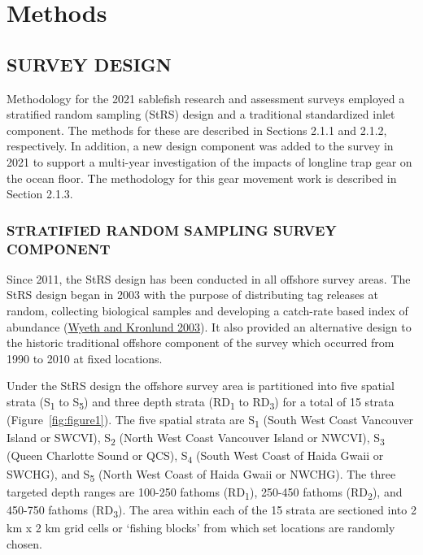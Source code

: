\documentclass[12pt]{article}\usepackage[]{graphicx}\usepackage[]{color}
\begin{document}
\hypertarget{methods}{%
\section{Methods}\label{methods}}

\hypertarget{survey-design}{%
\subsection{SURVEY DESIGN}\label{survey-design}}

Methodology for the 2021 sablefish research and assessment surveys employed a stratified random sampling (StRS) design and a traditional standardized inlet component. The methods for these are described in Sections 2.1.1 and 2.1.2, respectively. In addition, a new design component was added to the survey in 2021 to support a multi-year investigation of the impacts of longline trap gear on the ocean floor. The methodology for this gear movement work is described in Section 2.1.3.

\hypertarget{stratified-random-sampling-survey-component}{%
\subsubsection{STRATIFIED RANDOM SAMPLING SURVEY COMPONENT}\label{stratified-random-sampling-survey-component}}

Since 2011, the StRS design has been conducted in all offshore survey areas. The StRS design began in 2003 with the purpose of distributing tag releases at random, collecting biological samples and developing a catch-rate based index of abundance (\protect\hyperlink{ref-Wyeth2003}{Wyeth and Kronlund 2003}). It also provided an alternative design to the historic traditional offshore component of the survey which occurred from 1990 to 2010 at fixed locations.

Under the StRS design the offshore survey area is partitioned into five spatial strata (S\textsubscript{1} to S\textsubscript{5}) and three depth strata (RD\textsubscript{1} to RD\textsubscript{3}) for a total of 15 strata (Figure~\ref{fig:figure1}). The five spatial strata are S\textsubscript{1} (South West Coast Vancouver Island or SWCVI), S\textsubscript{2} (North West Coast Vancouver Island or NWCVI), S\textsubscript{3} (Queen Charlotte Sound or QCS), S\textsubscript{4} (South West Coast of Haida Gwaii or SWCHG), and S\textsubscript{5} (North West Coast of Haida Gwaii or NWCHG). The three targeted depth ranges are 100-250 fathoms (RD\textsubscript{1}), 250-450 fathoms (RD\textsubscript{2}), and 450-750 fathoms (RD\textsubscript{3}). The area within each of the 15 strata are sectioned into 2 km x 2 km grid cells or `fishing blocks' from which set locations are randomly chosen.
\end{document}
